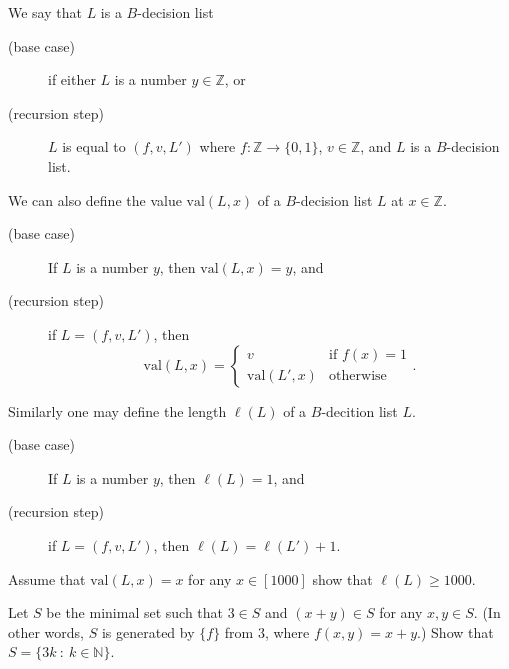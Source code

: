 \documentclass[addpoints]{exam}
\begin{document}
  \pagestyle{headandfoot}
  \runningheadrule

  \firstpagefooter{}{}{}
  \runningfooter{}{}{}
  \begin{flushright}

    \vspace{0.2in}
  \end{flushright}

  \begin{questions}
    \question[10]
      We say that $L$ is a $B$-decision list 
			\begin{description}
			  \item[(base case)] if either $L$ is a number $y \in \mathbb{Z}$, or
			  \item[(recursion step)] $L$ is equal to $(f, v, L')$ where $f : \mathbb{Z} \to
			  \{0, 1\}$, $v \in \mathbb{Z}$, and $L$ is a $B$-decision list.
			\end{description}
			
			We can also define the value $\mathrm{val}(L, x)$ of a $B$-decision list $L$ at
			$x \in \mathbb{Z}$.
			\begin{description}
			  \item[(base case)] If $L$ is a number $y$, then $\mathrm{val}(L, x) = y$, and
			  \item[(recursion step)] if $L = (f, v, L')$, then
			    \[
			      \mathrm{val}(L, x) = 
			      \begin{cases}
			        v & \text{if } f(x) = 1 \\
			        \mathrm{val}(L', x) & \text{otherwise}
			      \end{cases}.
			    \]
			\end{description}
			
			Similarly one may define the length $\ell(L)$ of a $B$-decition list $L$.
			\begin{description}
			  \item[(base case)] If $L$ is a number $y$, then $\ell(L) = 1$, and
			  \item[(recursion step)] if $L = (f, v, L')$, then $\ell(L) = \ell(L') + 1$.
			\end{description}
			
			Assume that $\mathrm{val}(L, x) = x$ for any $x \in [1000]$ show that 
			$\ell(L) \ge 1000$.

      \begin{solution}[\stretch{1}]
      \end{solution}
      \newpage
    \question[10]
      Let $S$ be the minimal set such that $3 \in S$ and $(x + y) \in S$ for any $x, y \in S$.
			(In other words, $S$ is generated by $\{f\}$ from $3$, where $f(x, y) = x + y$.)
			Show that $S = \{3k ~:~ k \in \mathbb{N}\}$.

      \begin{solution}[\stretch{1}]
      \end{solution}
      \newpage
  \end{questions}
\end{document}
